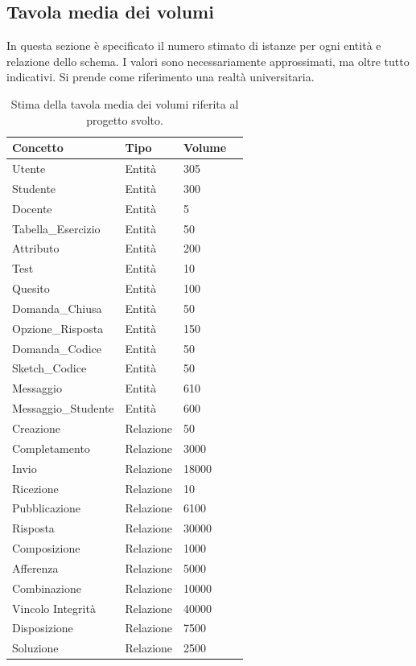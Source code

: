 \documentclass{article}
\begin{document}
\subsection{Tavola media dei volumi}
In questa sezione è specificato il numero stimato di istanze per ogni entità e relazione dello schema. I valori sono necessariamente approssimati, ma oltre tutto indicativi. Si prende come riferimento una realtà universitaria.
\begin{table}[h]
    \centering
    \begin{tabularx}{\textwidth}{|X|X|X|X|}
        \hline
        \bf Concetto & \bf Tipo & \bf Volume \\
        \hline
        Utente & Entità & 305 \\
        \hline
        Studente & Entità & 300 \\
        \hline
        Docente & Entità & 5 \\
        \hline
        Tabella\_Esercizio & Entità & 50 \\
        \hline
        Attributo & Entità & 200 \\
        \hline
        Test & Entità & 10 \\
        \hline
        Quesito & Entità & 100 \\
        \hline
        Domanda\_Chiusa & Entità & 50 \\
        \hline
        Opzione\_Risposta & Entità & 150 \\
        \hline
        Domanda\_Codice & Entità & 50 \\
        \hline
        Sketch\_Codice & Entità & 50 \\
        \hline
        Messaggio & Entità & 610 \\
        \hline
        Messaggio\_Studente & Entità & 600 \\
        \hline
        Creazione & Relazione & 50 \\
        \hline
        Completamento & Relazione & 3000 \\
        \hline
        Invio & Relazione & 18000 \\
        \hline
        Ricezione & Relazione & 10 \\
        \hline
        Pubblicazione & Relazione & 6100 \\
        \hline
        Risposta & Relazione & 30000 \\
        \hline
        Composizione & Relazione & 1000 \\
        \hline
        Afferenza & Relazione & 5000 \\
        \hline
        Combinazione & Relazione & 10000 \\
        \hline
        Vincolo Integrità & Relazione & 40000 \\
        \hline
        Disposizione & Relazione & 7500 \\
        \hline
        Soluzione & Relazione & 2500 \\
        \hline
    \end{tabularx}
    \caption{Stima della tavola media dei volumi riferita al progetto svolto.}
\end{table}
\end{document}
